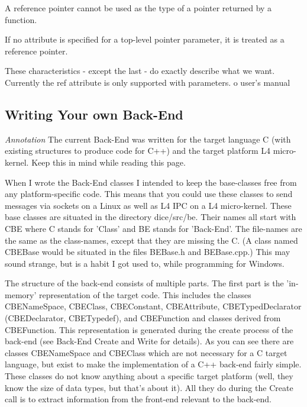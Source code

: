 A reference pointer cannot be used as the type of a pointer returned
by a function.

If no attribute is specified for a top-level pointer parameter, it is
treated as a reference pointer.

These characteristics - except the last - do exactly describe what we
want. Currently the ref attribute is only supported with parameters. o
user's manual

\subsection{Writing Your own Back-End}
\emph{Annotation} 
The current Back-End was written for the target language C (with
existing structures to produce code for C++) and the target platform
L4 micro-kernel. Keep this in mind while reading this page.

When I wrote the Back-End classes I intended to keep the base-classes
free from any platform-specific code. This means that you could use
these classes to send messages via sockets on a Linux as well as L4
IPC on a L4 micro-kernel. These base classes are situated in the
directory dice/src/be. Their names all start with CBE where C stands
for 'Class' and BE stands for 'Back-End'. The file-names are the same
as the class-names, except that they are missing the C. (A class named
CBEBase would be situated in the files BEBase.h and BEBase.cpp.) This
may sound strange, but is a habit I got used to, while programming for
Windows.

The structure of the back-end consists of multiple parts. The first
part is the 'in-memory' representation of the target code. This
includes the classes CBENameSpace, CBEClass, CBEConstant,
CBEAttribute, CBETypedDeclarator (CBEDeclarator, CBETypedef), and
CBEFunction and classes derived from CBEFunction. This representation
is generated during the create process of the back-end (see Back-End
Create and Write for details). As you can see there are classes
CBENameSpace and CBEClass which are not necessary for a C target
language, but exist to make the implementation of a C++ back-end
fairly simple. These classes do not know anything about a specific
target platform (well, they know the size of data types, but that's
about it). All they do during the Create call is to extract
information from the front-end relevant to the back-end.

